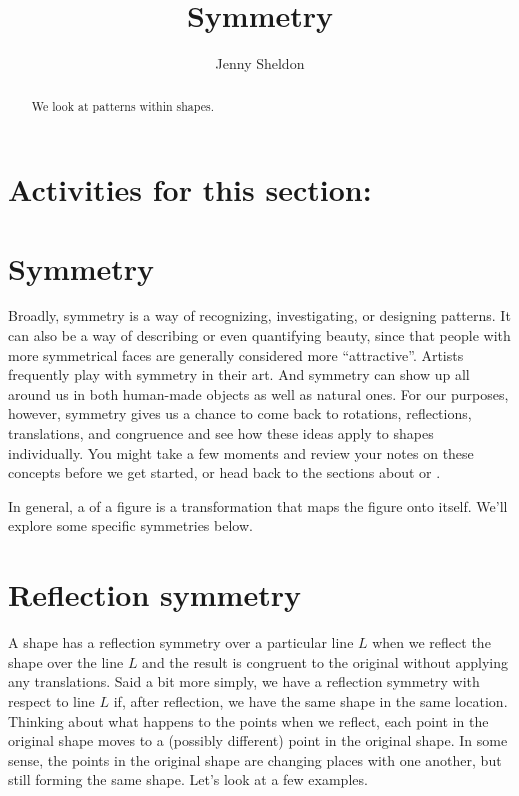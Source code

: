 \documentclass{ximera}
\title{Symmetry}
\author{Jenny Sheldon}
\begin{document}
\begin{abstract}
We look at patterns within shapes.
\end{abstract}
\maketitle

\section{Activities for this section:} 

\section{Symmetry}

Broadly, symmetry is a way of recognizing, investigating, or designing patterns. It can also be a way of describing or even quantifying beauty, since  that people with more symmetrical faces are generally considered more ``attractive''. Artists frequently play with symmetry in their art. And symmetry can show up all around us in both human-made objects as well as natural ones. For our purposes, however, symmetry gives us a chance to come back to rotations, reflections, translations, and congruence and see how these ideas apply to shapes individually. You might take a few moments and review your notes on these concepts before we get started, or head back to the sections about  or .

In general, a  of a figure is a transformation that maps the figure onto itself. We'll explore some specific symmetries below. 

\section{Reflection symmetry}

A shape has a reflection symmetry over a particular line $L$ when we reflect the shape over the line $L$ and the result is congruent to the original without applying any translations. Said a bit more simply, we have a reflection symmetry with respect to line $L$ if, after reflection, we have the same shape in the same location. Thinking about what happens to the points when we reflect, each point in the original shape moves to a (possibly different) point in the original shape. In some sense, the points in the original shape are changing places with one another, but still forming the same shape. Let's look at a few examples.
\end{document}
